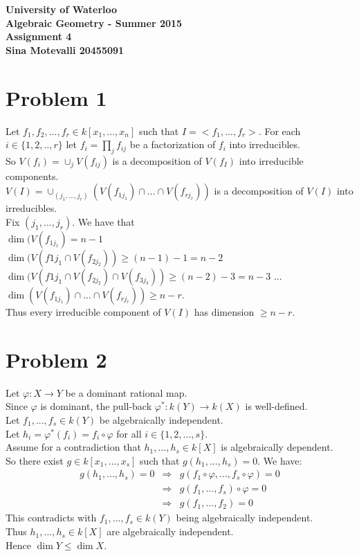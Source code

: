 \documentclass[12pt]{article}
\begin{document}
\begin{center}
  {\Large\bf University of Waterloo}\\
  \vspace{3mm}
         {\Large\bf Algebraic Geometry - Summer 2015}\\
         \vspace{2mm}
                {\Large\bf Assignment 4}\\
                \vspace{3mm}
                \textbf{Sina Motevalli 20455091}
\end{center}
\section*{Problem 1}
Let $f_1,f_2,...,f_r\in k[x_1,...,x_n]$ such that $I=<f_1,...,f_r>$. 
For each $i \in \{1,2,..,r\}$ let $f_i=\prod_{j} f_{ij}$ be a factorization of $f_i$ into irreducibles. \\
So $V(f_i)=\cup_j V(f_{ij})$ is a decomposition of $V(f_I)$ into irreducible components. \\
$V(I)=\cup_{(j_1,...,j_r)} (V(f_{1j_1}) \cap ... \cap V(f_{rj_r}))$ is a decomposition of $V(I)$ into irreducibles. \\
Fix $(j_1,...,j_r)$. We have that \\
$\dim ( V(f_{1j_1}) = n-1$\\ 
$\dim (V(f{1j_1} \cap V(f_{2j_2})) \ge (n-1)-1=n-2$ \\
$\dim (V(f{1j_1} \cap V(f_{2j_2}) \cap V(f_{3j_3})) \ge (n-2)-3=n-3$
... \\ 
$\dim (V(f_{1j_1}) \cap ... \cap V(f_{rj_r})) \ge n-r$. \\
Thus every irreducible component of $V(I)$ has dimension $\ge n-r$.

\section*{Problem 2}
Let $\varphi:X \rightarrow Y$ be a dominant rational map. \\
Since $\varphi$ is dominant, the pull-back $\varphi^* :k(Y) \rightarrow k(X)$ is well-defined. \\
Let $f_1,...,f_s \in k(Y)$ be algebraically independent.  \\
Let $h_i = \varphi^*(f_i)=f_i \circ \varphi$ for all $i \in \{1,2,...,s\}$. \\
Assume for a contradiction that $h_1,...,h_s \in k[X]$ is algebraically dependent. \\
So there exist $g \in k[x_1,...,x_s]$ such that
$g(h_1,...,h_s)=0$. We have:
\begin{eqnarray*}
g(h_1,...,h_s)=0 &\Rightarrow &
g(f_1 \circ \varphi,...,f_s \circ \varphi) =0 \\ &\Rightarrow &
g(f_1,...,f_s) \circ \varphi =0 \\ &\Rightarrow &
g(f_1,...,f_2) =0
\end{eqnarray*}
This contradicts with $f_1,...,f_s \in k(Y)$ being algebraically independent.\\
Thus
$h_1,...,h_s \in k[X]$ are algebraically independent. \\
Hence $\dim Y \le \dim X$.
\end{document}

